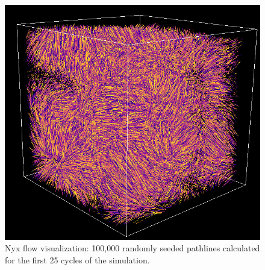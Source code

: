 \begin{figure}[t]
\centering
\includegraphics[width=0.65\linewidth]{images/pathlines_nyx.png}
\caption{Nyx flow visualization: 100,000 randomly seeded pathlines calculated for the first 25 cycles of the simulation.}
\label{fig:pathlines_nyx}
\end{figure}


